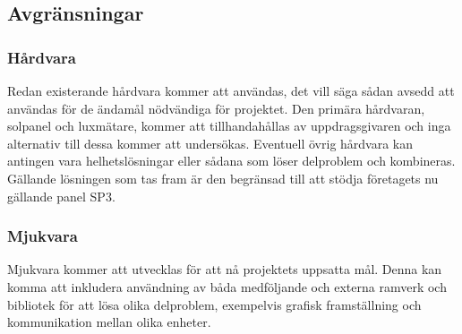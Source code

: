    \subsection{Avgränsningar} %
    \label{sub:avgr_nsningar}
        \subsubsection{Hårdvara} %
        \label{ssub:h_rdvara}
            Redan existerande hårdvara kommer att användas, det vill säga sådan avsedd att användas för de ändamål nödvändiga för projektet. 
            Den primära hårdvaran, solpanel och luxmätare, kommer att tillhandahållas av uppdragsgivaren och inga alternativ till dessa kommer att undersökas. 
            Eventuell övrig hårdvara kan antingen vara helhetslösningar eller sådana som löser delproblem och kombineras. 
            Gällande lösningen som tas fram är den begränsad till att stödja företagets nu gällande panel SP3.\bigskip

        \subsubsection{Mjukvara} %
        \label{ssub:mjukvara}
            Mjukvara kommer att utvecklas för att nå projektets uppsatta mål. 
            Denna kan komma att inkludera användning av båda medföljande och externa ramverk och bibliotek för att lösa olika delproblem, exempelvis grafisk framställning och kommunikation mellan olika enheter.


